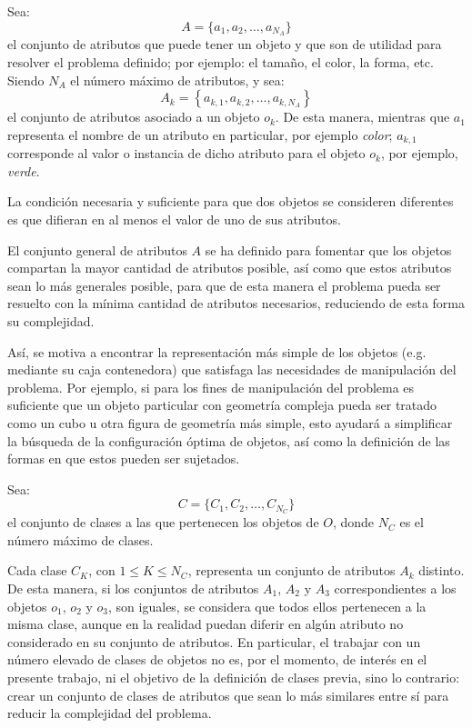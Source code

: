 Sea:
%
\begin{equation}
\label{eq:atributos}
A = \{ a_1, a_2, \ldots, a_{N_A} \}
\end{equation}
%
el conjunto de atributos que puede tener un objeto y que son de utilidad para resolver el problema definido; por ejemplo: el tamaño, el color, la forma, etc.
Siendo $N_A$ el número máximo de atributos, y sea:
%
\begin{equation}
\label{eq:atributos_objeto}
A_k = \left\{ a_{k, 1}, a_{k, 2}, \ldots, a_{k, N_A} \right\}
\end{equation}
%
el conjunto de atributos asociado a un objeto $o_k$.
De esta manera, mientras que $a_{1}$ representa el nombre de un atributo en particular, por ejemplo \textit{color}; $a_{k, 1}$ corresponde al valor o instancia de dicho atributo para el objeto $o_k$, por ejemplo, \textit{verde}.

La condición necesaria y suficiente para que dos objetos se consideren diferentes es que difieran en al menos el valor de uno de sus atributos.

El conjunto general de atributos $A$ se ha definido para fomentar que los objetos compartan la mayor cantidad de atributos posible, así como que estos atributos sean lo más generales posible, para que de esta manera el problema pueda ser resuelto con la mínima cantidad de atributos necesarios, reduciendo de esta forma su complejidad.

Así, se motiva a encontrar la representación más simple de los objetos (e.g. mediante su caja contenedora) que satisfaga las necesidades de manipulación del problema.
Por ejemplo, si para los fines de manipulación del problema es suficiente que un objeto particular con geometría compleja pueda ser tratado como un cubo u otra figura de geometría más simple, esto ayudará a simplificar la búsqueda de la configuración óptima de objetos, así como la definición de las formas en que estos pueden ser sujetados.

Sea:
%
\begin{equation}
\label{eq:clases}
C = \{ C_1, C_2, \ldots, C_{N_C} \}
\end{equation}
%
el conjunto de clases a las que pertenecen los objetos de $O$, donde $N_C$ es el número máximo de clases.

Cada clase $C_K$, con $1 \leq K \leq N_C$, representa un conjunto de atributos $A_k$ distinto.
De esta manera, si los conjuntos de atributos $A_1$, $A_2$ y $A_3$ correspondientes a los objetos $o_1$, $o_2$ y $o_3$, son iguales, se considera que todos ellos pertenecen a la misma clase, aunque en la realidad puedan diferir en algún atributo no considerado en su conjunto de atributos.
En particular, el trabajar con un número elevado de clases de objetos no es, por el momento, de interés en el presente trabajo, ni el objetivo de la definición de clases previa, sino lo contrario: crear un conjunto de clases de atributos que sean lo más similares entre sí para reducir la complejidad del problema.

